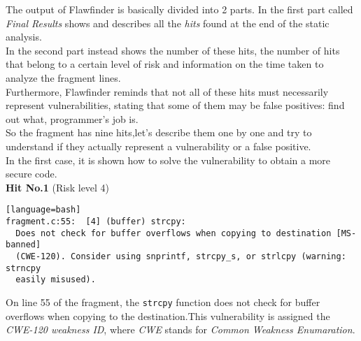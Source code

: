 \documentclass[a4paper,12pt]{article}
\begin{document}
The output of Flawfinder is basically divided into 2 parts.
In the first part called \textit{Final Results} shows and describes all the \textit{hits} found at the end of the static analysis.\\
In the second part instead shows the number of these hits, the number of hits that belong to a certain level of risk and information on the time taken to analyze the fragment lines.\\
Furthermore, Flawfinder reminds that not all of these hits must necessarily represent vulnerabilities, stating that some of them may be false positives: find out what, programmer's job is.\\
So the fragment has nine hits,let's describe them one by one and try to understand if they actually represent a vulnerability or a false positive.\\
In the first case, it is shown how to solve the vulnerability to obtain a more secure code.\\
\newpage
\textbf{Hit No.1} (Risk level 4)
\begin{lstlisting}[style=DOS][language=bash]
fragment.c:55:  [4] (buffer) strcpy:
  Does not check for buffer overflows when copying to destination [MS-banned]
  (CWE-120). Consider using snprintf, strcpy_s, or strlcpy (warning: strncpy
  easily misused).
\end{lstlisting}
On line 55 of the fragment, the \texttt{strcpy} function does not check for buffer overflows when copying to the destination.This vulnerability is assigned the \textit{CWE-120 weakness ID}, where \textit{CWE} stands for \textit{Common Weakness Enumaration}\cite{CWE}.\\
\end{document}
